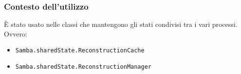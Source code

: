\subsubsection{Contesto dell'utilizzo}
È stato usato nelle classi che mantengono gli stati condivisi tra i vari processi. Ovvero:
\begin{itemize}
	\item \texttt{Samba.sharedState.ReconstructionCache}
	\item \texttt{Samba.sharedState.ReconstructionManager}	
\end{itemize}




















